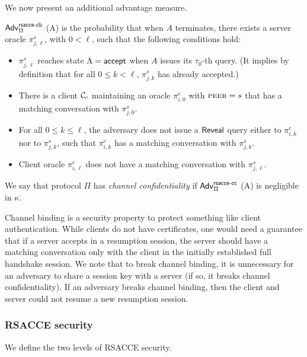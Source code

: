 We now present an additional advantage measure.

\begin{definition} \label{def:rsacce-cb}
 $\mathsf{Adv}^{\mathsf{rsacce\textsc{-} cb}}_{\Pi}$ (A) is the probability that when $A$ terminates, there exists
 a server oracle $\pi^s_{j, \ell}$, with $0< \ell$, such that the following conditions hold:

 \begin{itemize}
  \item{$\pi^s_{j,\ell}$ reaches state $\Lambda=\mathsf{accept}$ when $A$ issues
  its $\tau_0$-th query. (It implies by definition that for all $0\leq k < \ell$,
  $\pi^s_{j,k}$ has already accepted.)}

  \item{There is a client $\mathcal{C}_c$ maintaining an oracle $\pi^c_{i,0}$ with $\textsc{peer}=s$
  that has a matching conversation with $\pi^s_{j,0}$.}

  \item{For all $0\leq k \leq \ell$, the adversary does not issue a $\mathsf{Reveal}$ query either to
  $\pi^c_{i,k}$ nor to $\pi^s_{j,k}$,
  such that $\pi^c_{i,k}$ has a matching conversation with $\pi^s_{j,k}$.}

  \item{Client oracle $\pi^c_{i, \ell}$  does not have a matching conversation
  with $\pi^s_{j,\ell}$.}

 \end{itemize}
 We say that protocol $\Pi$ has \textit{channel confidentiality}
 if $\mathsf{Adv}^{\mathsf{rsacce\textsc{-} cc}}_{\Pi}$ (A) is negligible in $\kappa$.
\end{definition}

\begin{remark}
Channel binding is a security property to protect something like client authentication.
While clients do not have certificates, one would need a guarantee that if a server accepts
in a resumption session, the server should have a matching conversation only with the client
in the initially established full handshake session.
We note that to break channel binding, it is unnecessary for an adversary to share a session key with a server
(if so, it breaks channel confidentiality).
If an adversary breaks channel binding, then the client and server could not resume a new resumption session.
\end{remark}

\subsubsection{RSACCE security}
We define the two levels of RSACCE security.


